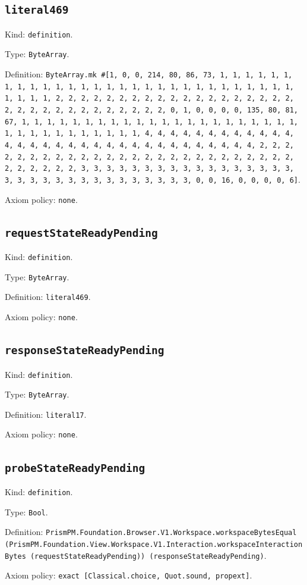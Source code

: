 \documentclass[11pt]{article}
\begin{document}
\subsection*{\texttt{literal469}}
\noindent Kind: \texttt{definition}.\par
\noindent Type: \texttt{ByteArray}.\par
\noindent Definition: \texttt{ByteArray.mk \#[1, 0, 0, 214, 80, 86, 73, 1, 1, 1, 1, 1, 1, 1, 1, 1, 1, 1, 1, 1, 1, 1, 1, 1, 1, 1, 1, 1, 1, 1, 1, 1, 1, 1, 1, 1, 1, 1, 1, 1, 2, 2, 2, 2, 2, 2, 2, 2, 2, 2, 2, 2, 2, 2, 2, 2, 2, 2, 2, 2, 2, 2, 2, 2, 2, 2, 2, 2, 2, 2, 2, 2, 0, 1, 0, 0, 0, 0, 135, 80, 81, 67, 1, 1, 1, 1, 1, 1, 1, 1, 1, 1, 1, 1, 1, 1, 1, 1, 1, 1, 1, 1, 1, 1, 1, 1, 1, 1, 1, 1, 1, 1, 1, 1, 1, 4, 4, 4, 4, 4, 4, 4, 4, 4, 4, 4, 4, 4, 4, 4, 4, 4, 4, 4, 4, 4, 4, 4, 4, 4, 4, 4, 4, 4, 4, 4, 4, 2, 2, 2, 2, 2, 2, 2, 2, 2, 2, 2, 2, 2, 2, 2, 2, 2, 2, 2, 2, 2, 2, 2, 2, 2, 2, 2, 2, 2, 2, 2, 2, 3, 3, 3, 3, 3, 3, 3, 3, 3, 3, 3, 3, 3, 3, 3, 3, 3, 3, 3, 3, 3, 3, 3, 3, 3, 3, 3, 3, 3, 3, 3, 3, 0, 0, 16, 0, 0, 0, 0, 6]}.\par
\noindent Axiom policy: \texttt{none}.\par
\subsection*{\texttt{requestStateReadyPending}}
\noindent Kind: \texttt{definition}.\par
\noindent Type: \texttt{ByteArray}.\par
\noindent Definition: \texttt{literal469}.\par
\noindent Axiom policy: \texttt{none}.\par
\subsection*{\texttt{responseStateReadyPending}}
\noindent Kind: \texttt{definition}.\par
\noindent Type: \texttt{ByteArray}.\par
\noindent Definition: \texttt{literal17}.\par
\noindent Axiom policy: \texttt{none}.\par
\subsection*{\texttt{probeStateReadyPending}}
\noindent Kind: \texttt{definition}.\par
\noindent Type: \texttt{Bool}.\par
\noindent Definition: \texttt{PrismPM.Foundation.Browser.V1.Workspace.workspaceBytesEqual (PrismPM.Foundation.View.Workspace.V1.Interaction.workspaceInteractionBytes (requestStateReadyPending)) (responseStateReadyPending)}.\par
\noindent Axiom policy: \texttt{exact [Classical.choice, Quot.sound, propext]}.\par
\end{document}
